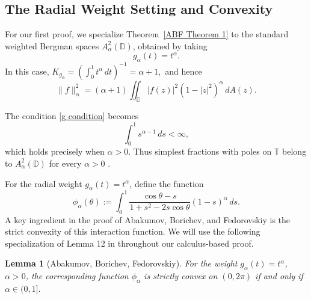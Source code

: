 \documentclass{article}
\newtheorem{lemma}[theorem]{Lemma}
\begin{document}
   
\subsection{The Radial Weight Setting and Convexity}

For our first proof, we specialize Theorem~\ref{ABF Theorem 1} to the standard weighted Bergman spaces
$A^2_\alpha(\mathbb{D})$, obtained by taking
\[g_\alpha(t)=t^\alpha.\]
In this case,  $K_{g_\alpha}=\left(\int_0^1 t^\alpha\,dt\right)^{-1}=\alpha+1,$ and hence
\[
\|f\|_\alpha^2
=
(\alpha+1)
\iint_{\mathbb{D}}
|f(z)|^2
(1-|z|^2)^\alpha\,dA(z).
\]

The condition \eqref{g condition} becomes
\[
\int_0^1 s^{\alpha-1}\,ds<\infty,
\]
which holds precisely when $\alpha>0$. Thus simplest fractions with poles on $\mathbb{T}$ belong to $A^2_\alpha(\mathbb{D})$ for every $\alpha>0$ \cite{ABF2021}.

For the radial weight $g_\alpha(t)=t^\alpha$, define the function
\[
\phi_\alpha(\theta)
:=
\int_0^1
\frac{\cos\theta-s}
{1+s^2-2s\cos\theta}
(1-s)^\alpha\,ds.
\]
A key ingredient in the proof of Abakumov, Borichev, and Fedorovskiy is the strict convexity of this interaction function. We will use the following specialization of Lemma 12 in \cite{ABF2021} throughout our calculus-based proof.

\begin{lemma}[Abakumov, Borichev, Fedorovskiy]
\label{ABF convexity lemma}
For the weight $g_\alpha(t)=t^\alpha$, $\alpha>0$, the
    corresponding function $\phi_\alpha$ is strictly convex on $(0,2\pi)$ if and only if $\alpha\in(0,1].$

   
\end{lemma}
\end{document}
